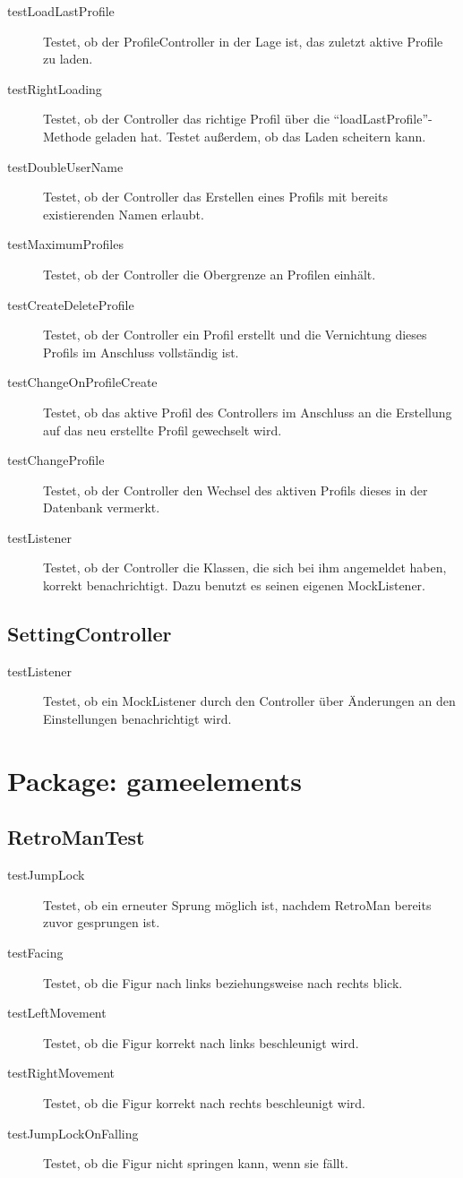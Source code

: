 \documentclass[parskip=full]{scrreprt}
\begin{document}
\begin{description}
	\item[testLoadLastProfile] Testet, ob der ProfileController in der Lage ist, das zuletzt aktive Profile zu laden.
	\item[testRightLoading] Testet, ob der Controller das richtige Profil über die \enquote{loadLastProfile}-Methode geladen hat. Testet außerdem, ob das Laden scheitern kann.
	\item[testDoubleUserName] Testet, ob der Controller das Erstellen eines Profils mit bereits existierenden Namen erlaubt.
	\item[testMaximumProfiles] Testet, ob der Controller die Obergrenze an Profilen einhält.
	\item[testCreateDeleteProfile] Testet, ob der Controller ein Profil erstellt und die Vernichtung dieses Profils im Anschluss vollständig ist.
	\item[testChangeOnProfileCreate] Testet, ob das aktive Profil des Controllers im Anschluss an die Erstellung auf das neu erstellte Profil gewechselt wird.
	\item[testChangeProfile] Testet, ob der Controller den Wechsel des aktiven Profils dieses in der Datenbank vermerkt.
	\item[testListener] Testet, ob der Controller die Klassen, die sich bei ihm angemeldet haben, korrekt benachrichtigt. Dazu benutzt es seinen eigenen MockListener.
\end{description}

\subsection{SettingController}

\begin{description}
	\item [testListener] Testet, ob ein MockListener durch den Controller über Änderungen an den Einstellungen benachrichtigt wird.
\end{description}

\section{Package: gameelements}

\subsection{RetroManTest}

\begin{description}
	\item[testJumpLock] Testet, ob ein erneuter Sprung möglich ist, nachdem RetroMan bereits zuvor gesprungen ist.
	\item[testFacing] Testet, ob die Figur nach links beziehungsweise nach rechts blick.
	\item[testLeftMovement] Testet, ob die Figur korrekt nach links beschleunigt wird.
	\item[testRightMovement] Testet, ob die Figur korrekt nach rechts beschleunigt wird.
	\item[testJumpLockOnFalling] Testet, ob die Figur nicht springen kann, wenn sie fällt.
\end{description}
\end{document}
